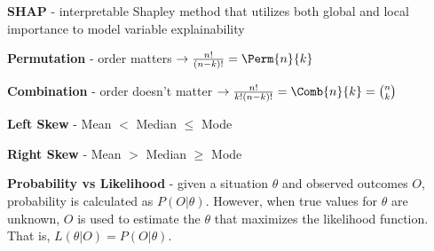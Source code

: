 \documentclass[10pt,landscape]{article}
\begin{document}
\begin{multicols}{3}
\textbf{SHAP} - interpretable Shapley method that utilizes both global and local importance to model variable explainability

\textbf{Permutation} - order matters  $\to \frac{n!}{(n-k)!} = \Perm{n}{k}$

\textbf{Combination} - order doesn't matter $\to \frac{n!}{k!(n-k)!}= \Comb{n}{k}= \binom nk$

\textbf{Left Skew} - Mean $<$ Median $\leq$ Mode

\textbf{Right Skew} - Mean $>$ Median $\geq$ Mode

\textbf{Probability vs Likelihood} - given a situation $\theta$ and observed outcomes $O$, probability is calculated as $P(O|\theta)$. However, when true values for $\theta$ are unknown, $O$ is used to estimate the $\theta$ that maximizes the likelihood function. That is, $L(\theta|O) = P(O|\theta)$.
\newpage
\end{multicols}
\end{document}
